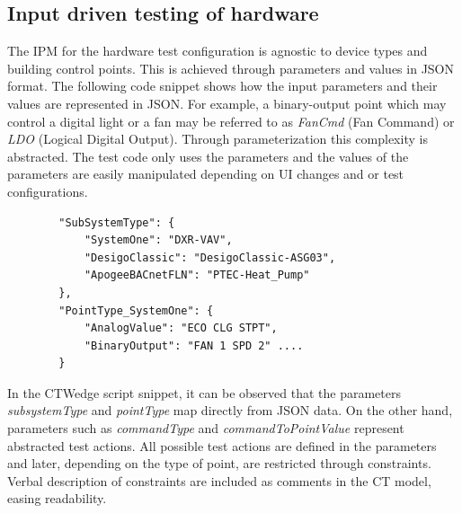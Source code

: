\documentclass[conference]{IEEEtran}
\begin{document}
	\subsection{Input driven testing of hardware} \label{Input driven testing of hardware}
	
	The IPM for the hardware test configuration is agnostic to device types and building control points.
	This is achieved through parameters and values in JSON format.
	The following code snippet shows how the input parameters and their values are represented in JSON. 
	For example, a binary-output point which may control a digital light or a fan may be referred to as \textit{FanCmd} (Fan Command) or \textit{LDO} (Logical Digital Output).
  Through parameterization this complexity is abstracted. The test code only uses the parameters and the values of the parameters are easily manipulated depending on UI changes and or test configurations.
		
	\begin{lstlisting}
		"SubSystemType": {
			"SystemOne": "DXR-VAV",
			"DesigoClassic": "DesigoClassic-ASG03",
			"ApogeeBACnetFLN": "PTEC-Heat_Pump"
		},
		"PointType_SystemOne": {
			"AnalogValue": "ECO CLG STPT",
			"BinaryOutput": "FAN 1 SPD 2" ....
		}
	\end{lstlisting}

	In the CTWedge script snippet, it can be observed that the parameters \emph{subsystemType} and \emph{pointType} map directly from JSON data.
	On the other hand, parameters such as \emph{commandType} and \emph{commandToPointValue} represent abstracted test actions.
	All possible test actions are defined in the parameters and later, depending on the type of point, are restricted through constraints.
	Verbal description of constraints are included as comments in the CT model, easing readability.
\end{document}
